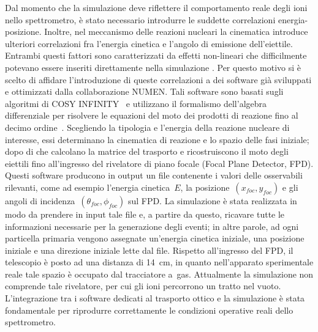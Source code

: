 Dal momento che la simulazione deve riflettere il comportamento reale degli ioni nello spettrometro, è stato necessario introdurre le suddette correlazioni energia-posizione. 
Inoltre, nel meccanismo delle reazioni nucleari la cinematica introduce ulteriori correlazioni fra l'energia cinetica e l'angolo di emissione dell'eiettile.
Entrambi questi fattori sono caratterizzati da effetti non-lineari che difficilmente potevano essere inseriti direttamente nella simulazione \geant. 
Per questo motivo si è scelto di affidare l'introduzione di queste correlazioni a dei software già sviluppati e ottimizzati dalla collaborazione NUMEN.
Tali software sono basati sugli algoritmi di COSY INFINITY~\cite{makino:nima99} e utilizzano il formalismo dell'algebra differenziale per risolvere le equazioni del moto dei prodotti di reazione fino al decimo ordine~\cite{cappuzzello:epja16}.
Scegliendo la tipologia e l'energia della reazione nucleare di interesse, essi determinano la cinematica di reazione e lo spazio delle fasi iniziale; dopo di che calcolano la matrice del trasporto e ricostruiscono il moto degli eiettili fino all'ingresso del rivelatore di piano focale (Focal Plane Detector, FPD).
Questi software producono in output un file contenente i valori delle osservabili rilevanti, come ad esempio l'energia cinetica~$E$, la posizione~$(x_{foc},y_{foc})$ e gli angoli di incidenza~$(\theta_{foc},\phi_{foc})$ sul FPD.
La simulazione \geant{} è stata realizzata in modo da prendere in input tale file e, a partire da questo, ricavare tutte le informazioni necessarie per la generazione degli eventi; in altre parole, ad ogni particella primaria vengono assegnate un'energia cinetica iniziale, una posizione iniziale e una direzione iniziale lette dal file.
Rispetto all'ingresso del FPD, il telescopio è posto ad una distanza di 14~cm, in quanto nell'apparato sperimentale reale tale spazio è occupato dal tracciatore a~gas. 
Attualmente la simulazione non comprende tale rivelatore, per cui gli ioni percorrono un tratto nel vuoto.
L'integrazione tra i software dedicati al trasporto ottico e la simulazione \geant{} è stata fondamentale per riprodurre correttamente le condizioni operative reali dello spettrometro.

